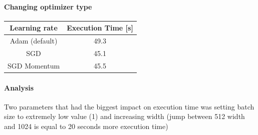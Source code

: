 \documentclass{article}[12pt]
\begin{document}
    \paragraph{Changing optimizer type}
    \begin{center}
        \begin{tabular}{ | c | c |  }
            \hline
         Learning rate & Execution Time [s] \\ 
         \hline
         Adam (default) & 49.3 \\  
         \hline
         SGD & 45.1 \\    
         \hline
         SGD Momentum & 45.5 \\    
         \hline
    \end{tabular}
    \end{center}

    \paragraph{Analysis}
    Two parameters that had the biggest impact on execution time was setting batch size to extremely low value (1) and increasing width (jump between 512 width and 1024 is equal to 20 seconds more execution time)
\end{document}
